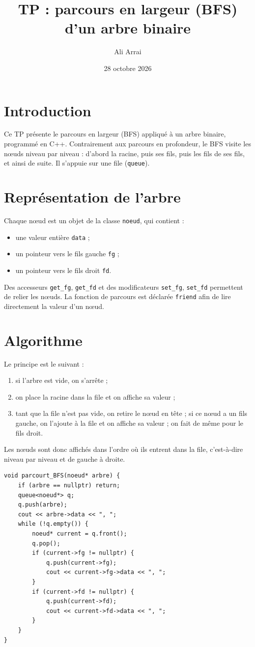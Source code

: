 \documentclass[12pt,a4paper]{article}
\title{TP : parcours en largeur (BFS)\\d'un arbre binaire}
\author{Ali Arrai}
\date{28 octobre 2026}
\begin{document}
\maketitle

\section{Introduction}
Ce TP présente le parcours en largeur (BFS) appliqué à un arbre binaire,
programmé en C++. Contrairement aux parcours en profondeur, le BFS visite les
nœuds niveau par niveau : d'abord la racine, puis ses fils, puis les fils de
ses fils, et ainsi de suite. Il s'appuie sur une file (\texttt{queue}).

\section{Représentation de l'arbre}
Chaque nœud est un objet de la classe \texttt{noeud}, qui contient :
\begin{itemize}
  \item une valeur entière \texttt{data} ;
  \item un pointeur vers le fils gauche \texttt{fg} ;
  \item un pointeur vers le fils droit \texttt{fd}.
\end{itemize}
Des accesseurs \texttt{get\_fg}, \texttt{get\_fd} et des modificateurs
\texttt{set\_fg}, \texttt{set\_fd} permettent de relier les nœuds. La fonction
de parcours est déclarée \texttt{friend} afin de lire directement la valeur
d'un nœud.

\section{Algorithme}
Le principe est le suivant :
\begin{enumerate}
  \item si l'arbre est vide, on s'arrête ;
  \item on place la racine dans la file et on affiche sa valeur ;
  \item tant que la file n'est pas vide, on retire le nœud en tête ; si ce
        nœud a un fils gauche, on l'ajoute à la file et on affiche sa valeur ;
        on fait de même pour le fils droit.
\end{enumerate}
Les nœuds sont donc affichés dans l'ordre où ils entrent dans la file, c'est-à-dire
niveau par niveau et de gauche à droite.

\begin{lstlisting}
void parcourt_BFS(noeud* arbre) {
    if (arbre == nullptr) return;
    queue<noeud*> q;
    q.push(arbre);
    cout << arbre->data << ", ";
    while (!q.empty()) {
        noeud* current = q.front();
        q.pop();
        if (current->fg != nullptr) {
            q.push(current->fg);
            cout << current->fg->data << ", ";
        }
        if (current->fd != nullptr) {
            q.push(current->fd);
            cout << current->fd->data << ", ";
        }
    }
}
\end{lstlisting}
\end{document}
